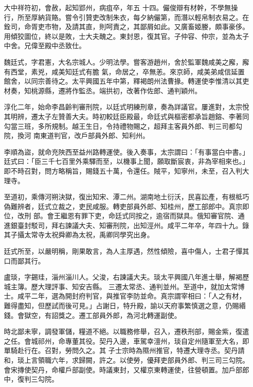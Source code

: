 \begin{pinyinscope}
 大中祥符初，會赦，起知郢州，病疽卒，年五
 十四。儼俊辯有材幹，不學無操行，所至厚納貨賂。嘗令引贊吏改制朱衣，每夕納儼第，而潛以輕帛制衣易之。在銓司，命胥吏市物，及請其直，則呵責之，其鄙屑如此。又廣畜姬媵，頗事豪侈。用傾狡圖位，終以是敗，士大夫醜之。東封恩，復其官。子仲容、仲宗，並為太子中舍。兄偉至殿中丞致仕。



 魏廷式，字君憲，大名宗城人。少明法學。嘗客游趙州，舍於監軍魏咸美之廨，廨有西堂，素兇，咸美知廷式有膽
 氣，命居之，卒無恙。來京師，咸美弟咸信延置館舍，以同宗善待之。太平興國五年中第，釋褐朗州法曹掾。轉運使李惟清以其吏材奏，知桃源縣，遷將作監丞。端拱初，改著作佐郎、通判穎州。



 淳化二年，始命李昌齡判審刑院，以廷式明練刑章，奏為詳議官。屢進對，太宗悅其明辨，遷太子左贊善大夫。時初較廷臣殿最，命廷式與樞密都承旨趙鎔、李著同勾當三班，多所規制。越王生日，令持禮物賜之，超拜主客員外郎、判三司都勾院，換河
 南東道判官，改戶部員外郎、知利州。



 李順為盜，就命充陜西至益州路轉運使。後入奏事，太宗謂曰：「有事當白中書。」廷式曰：「臣三千七百里外乘驛而至，以機事上聞，願取斷宸衷，非為宰相來也。」即不時召對，問方略稱旨，賜錢五十萬，令還任。賊平，知寧州，未至，召入判大理寺。



 至道初，乘傳河朔決獄，復出知宋、潭二州。湖南地土衍沃，民喜訟產，有根柢巧偽難辨者，廷式立裁之，吏民咸服。轉吏部員外郎、知桂州，歷工部郎中。真宗即位，改刑
 部。會王繼恩有罪下吏，命廷式同按之，逾宿而獄具。俄知審官院、通進銀臺封駁司，拜右諫議大夫、知審刑院，出知涇州。咸平二年卒，年四十九。錄其子攝太常寺太祝舜卿為太祝，禹卿同學究出身。



 廷式所至，以嚴明稱，剛果敢言，為人主厚遇，然性傾險，喜中傷人，士君子憚其口而鄙其行。



 盧琰，字錫珪，淄州淄川人。父浚，右諫議大夫。琰太平興國八年進士舉，解褐歷城主簿。歷大理評事、知安吉縣。
 三遷太常丞、通判並州。至道中，就加太常博士。咸平二年，選為開封府判官，與推官李防並命。真宗謂宰相曰：「人之有材，難得盡知，但歷試而後可見。」占謝日，特升殿，諭以天府事繁慎選之意，仍賜緡錢。會獄空，有詔獎之。遷工部員外郎，為河北轉運副使。



 時北鄙未寧，調發軍儲，糧道不絕。以職務修舉，召入，遷秩刑部，賜金紫，復遣之任。會城祁州，命專董其役。契丹入邊，車駕幸澶州，琰自定州隨軍至大名，即單騎赴行在。召對，勞問久之。其
 子士宗時為隰州推官，特遷大理寺丞。契丹請和，琰上言領職六年，求歸闕，許之。以使勞，優拜吏部員外郎、判三司三勾院。會宋摶使契丹，命權戶部副使。時議東封，又權京東轉運使，往營頓置。加戶部郎中，復判三勾院。




\end{pinyinscope}
